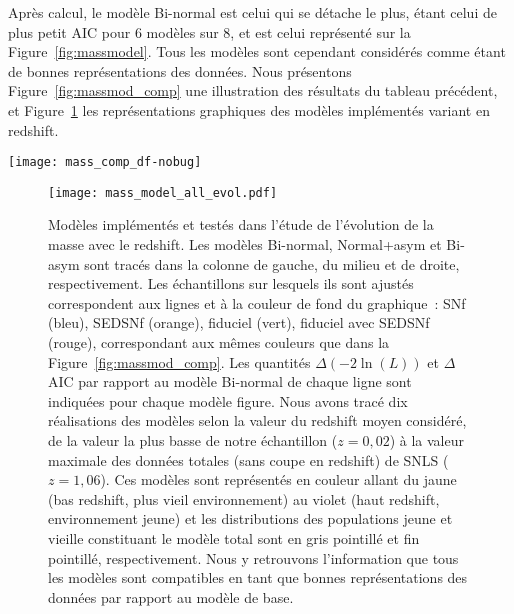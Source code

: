 \documentclass[../main/main.tex]{subfiles}
\begin{document}
Après calcul, le modèle Bi-normal est celui qui se détache le plus, étant celui de
plus petit AIC pour 6 modèles sur 8, et est celui représenté sur la
Figure~\ref{fig:massmodel}. Tous les modèles sont cependant considérés comme
étant de bonnes représentations des données. Nous présentons
Figure~\ref{fig:massmod_comp} une illustration des résultats du tableau
précédent, et Figure~\ref{fig:massmod_all} les représentations graphiques des
modèles implémentés variant en redshift.

\begin{SCfigure}[1][h!]
    \centering
    \texttt{[image: mass\_comp\_df-nobug]}
    \caption[$\Delta$AIC entre le modèle Bi-normal et les autres
    modèles]{$\Delta$AIC entre le modèle Bi-normal et les autres modèles (voir
        Tableau~\ref{tab:modelcomp}). Tous les modèles sont dérivants. Les
        marqueurs bleus, orange, verts et rouges montrent les résultats lorsque
        l'analyse est effectuée sur l'échantillon SNf, SEDSNf, fiduciel,
        fiduciel avec SEDSNf, respectivement (voir légende). Les bandes de
        couleur illustrent la validité des modèles, d'acceptable ($\Delta$AIC >
        -5) à exclu ($\Delta$AIC < -20). En suivant ces valeurs d'AIC, tous les
        modèles sont compatibles entre eux.}
    \label{fig:massmod_comp}
\end{SCfigure}

\begin{figure}[htbp]
    \vspace*{-3cm}
    \centerfloat
    \texttt{[image: mass\_model\_all\_evol.pdf]}
    \caption[Modèles implémentés et testés dans l'étude de l'évolution de
    l'étirement avec le redshift]{\scriptsize Modèles implémentés et testés dans
        l'étude de l'évolution de la masse avec le redshift. Les modèles
        Bi-normal, Normal+asym et Bi-asym sont tracés dans la colonne de gauche,
        du milieu et de droite, respectivement. Les échantillons sur lesquels
        ils sont ajustés correspondent aux lignes et à la couleur de fond du
        graphique~: SNf (bleu), SEDSNf (orange), fiduciel (vert), fiduciel avec
        SEDSNf (rouge), correspondant aux mêmes couleurs que dans la
        Figure~\ref{fig:massmod_comp}. Les quantités $\Delta(-2\ln(L))$ et
        $\Delta$AIC par rapport au modèle Bi-normal de chaque ligne sont
        indiquées pour chaque modèle figure. Nous avons tracé dix réalisations
        des modèles selon la valeur du redshift moyen considéré, de la valeur la
        plus basse de notre échantillon ($z = 0,02$) à la valeur maximale des
        données totales (sans coupe en redshift) de SNLS ($z = 1,06$). Ces
        modèles sont représentés en couleur allant du jaune (bas redshift, plus
        vieil environnement) au violet (haut redshift, environnement jeune) et
        les distributions des populations jeune et vieille constituant le modèle
        total sont en gris pointillé et fin pointillé, respectivement. Nous y
        retrouvons l'information que tous les modèles sont compatibles en tant
    que bonnes représentations des données par rapport au modèle de base.}
    \label{fig:massmod_all}
\end{figure}
\end{document}
